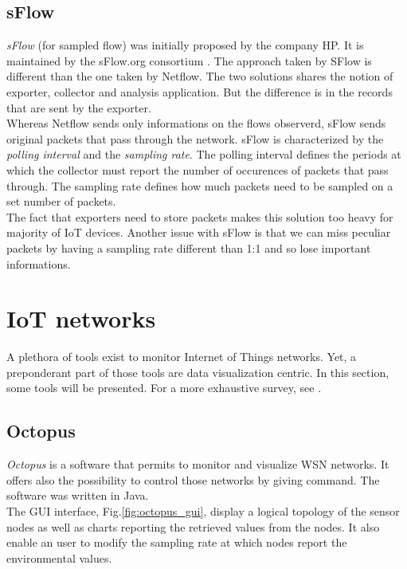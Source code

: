\subsection{sFlow}

\textit{sFlow} (for sampled flow) was initially proposed by the company HP. It is maintained by the sFlow.org consortium \cite{website:sflow}. The approach taken by SFlow is different than the one taken by Netflow. The two solutions shares the notion of exporter, collector and analysis application. But the difference is in the records that are sent by the exporter. \\

Whereas Netflow sends only informations on the flows observerd, sFlow sends original packets that pass through the network. sFlow is characterized by the \textit{polling interval} and the \textit{sampling rate}. The polling interval defines the periods at which the collector must report the number of occurences of packets that pass through. The sampling rate defines how much packets need to be sampled on a set number of packets. \\

The fact that exporters need to store packets makes this solution too heavy for majority of IoT devices. Another issue with sFlow is that we can miss peculiar packets by having a sampling rate different than 1:1 and so lose important informations.

\section{IoT networks}

A plethora of tools exist to monitor Internet of Things networks. Yet, a preponderant part of those tools are data visualization centric. In this section, some tools will be presented. For a more exhaustive survey, see \cite{parbat2010data}.

\subsection{Octopus}

\textit{Octopus} \cite{jurdak2011octopus} is a software that permits to monitor and visualize WSN networks. It offers also the possibility to control those networks by giving command. The software was written in Java. \\

The GUI interface, Fig.\ref{fig:octopus_gui}, display a logical topology of the sensor nodes as well as charts reporting the retrieved values from the nodes. It also enable an user to modify the sampling rate at which nodes report the environmental values. \\

